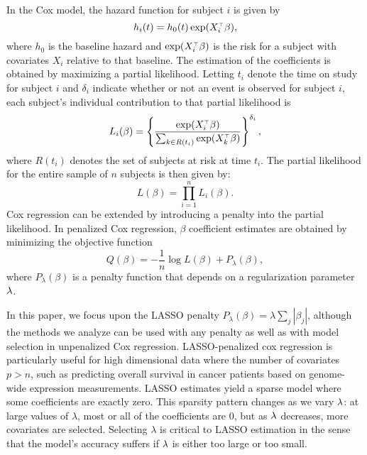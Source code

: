 \par In the Cox model, the hazard function for subject $i$ is given by 
\begin{equation*}
  h_{i}(t) = h_{0}(t) \exp( X_{i}^{\scriptscriptstyle\top}\beta),
\end{equation*} 
where $h_{0}$ is the baseline hazard and $\exp(X_i^{\scriptscriptstyle\top}\beta)$ is the risk for a subject with covariates $X_i$ relative to that baseline.  The estimation of the coefficients is obtained by maximizing a partial likelihood.  Letting $t_i$ denote the time on study for subject $i$ and $\delta_{i}$ indicate whether or not an event is observed for subject $i$, each subject's individual contribution to that partial likelihood is
\begin{equation}
  \label{eq:cox-pl-subj}
  L_{i}(\beta) = \left \{\frac{\exp ( X_{i}^{\scriptscriptstyle\top}\beta)}{\sum_{ k \in R(t_{i})}\exp ( X_{k}^{\scriptscriptstyle\top} \beta)}\right \}^{\delta_{i}},
\end{equation}
where $R(t_{i})$ denotes the set of subjects at risk at time $t_{i}$.  The partial likelihood for the entire sample of $n$ subjects is then given by:
\begin{equation}
  \label{eq:cox-pl-sum}
  L(\beta) =\prod_{i = 1}^{n} L_{i}(\beta).
\end{equation}
Cox regression can be extended by introducing a penalty into the partial likelihood.  In penalized Cox regression, $\beta$ coefficient estimates are obtained by minimizing the objective function
\begin{equation}
  \label{eq:obj}
  Q(\beta) = - \frac{1}{n} \log L(\beta) + P_{\lambda}(\beta),
\end{equation}
where $P_{\lambda}(\beta)$ is a penalty function that depends on a regularization parameter $\lambda$.

\par In this paper, we focus upon the LASSO penalty $P_{\lambda}(\beta) = \lambda \sum_{j} |\beta_{j}|$, although the methods we analyze can be used with any penalty as well as with model selection in unpenalized Cox regression. LASSO-penalized cox regression is particularly useful for high dimensional data where the number of covariates $p > n$, such as predicting overall survival in cancer patients based on genome-wide expression measurements. LASSO estimates yield a sparse model where some coefficients are exactly zero. This sparsity pattern changes as we vary $\lambda$: at large values of $\lambda$, most or all of the coefficients are 0, but as $\lambda$ decreases, more covariates are selected. Selecting $\lambda$ is critical to LASSO estimation in the sense that the model's accuracy suffers if $\lambda$ is either too large or too small.

